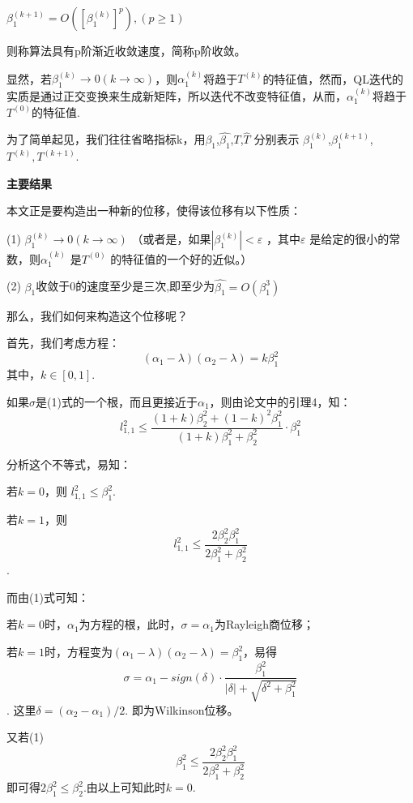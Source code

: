 \documentclass[12pt]{ctexart}
\begin{document}
\begin{center}
$\beta_1^{(k+1)}=O([\beta_1^{(k)}]^{p}),(p\geq1)$
\end{center}
则称算法具有p阶渐近收敛速度，简称p阶收敛。

显然，若$\beta_1^{(k)}\rightarrow0(k\rightarrow\infty)$，则$\alpha_1^{(k)}$将趋于$T^{(k)}$的特征值，然而，QL迭代的实质是通过正交变换来生成新矩阵，所以迭代不改变特征值，从而，$\alpha_1^{(k)}$将趋于$T^{(0)}$的特征值.

为了简单起见，我们往往省略指标k，用$\beta_1$,$\hat{\beta_1}$,$T$,$\hat{T}$
分别表示 $\beta_1^{(k)}$,$\beta_1^{(k+1)}$,$T^{(k)},T^{(k+1)}$.
\begin{center}
\textbf{主要结果}
\end{center}

本文正是要构造出一种新的位移，使得该位移有以下性质：

(1) $\beta_1^{(k)}\rightarrow0(k\rightarrow\infty)$
（或者是，如果$|\beta_1^{(k)}|<\varepsilon$  ，其中$\varepsilon$ 是给定的很小的常数，则$\alpha_1^{(k)}$ 是$T^{(0)}$ 的特征值的一个好的近似。）

(2) $\beta_1$收敛于0的速度至少是三次,即至少为$\hat{\beta_1}=O(\beta_1^3)$

那么，我们如何来构造这个位移呢？

首先，我们考虑方程：
\begin{equation}
(\alpha_1-\lambda)(\alpha_2-\lambda)=k\beta_1^{2}
\end{equation}
其中，$k\in[0,1]$.

如果$\sigma$是(1)式的一个根，而且更接近于$\alpha_1$，则由论文中的引理4，知：
\[
l_{1,1}^2 \leq \frac{(1+k)\beta_2^2 + (1-k)^2\beta_1^2}{(1+k)\beta_1^2
  + \beta_2^2} \cdot \beta_1^2
\]


分析这个不等式，易知：

若$k=0$，则 $l_{1,1}^2\leq\beta_1^2$.

若$k=1$，则\[ l_{1,1}^2\leq\frac{2\beta_2^2\beta_1^2 }{2\beta_1^2
  + \beta_2^2}\].

而由(1)式可知：

若$k=0$时，$\alpha_1$为方程的根，此时，$\sigma=\alpha_1$为Rayleigh商位移；

若$k=1$时，方程变为$(\alpha_1-\lambda)(\alpha_2-\lambda)=\beta_1^{2}$，易得
\[\sigma=\alpha_1-sign(\delta)\cdot\frac{\beta_1^2 }{|\delta|+\sqrt{\delta^2+\beta_1^2}}
\].
这里$\delta=(\alpha_2-\alpha_1)/2$.
即为Wilkinson位移。

又若(1)\[\beta_1^{2}\leq\frac{2\beta_2^2\beta_1^2 }{2\beta_1^2 + \beta_2^2}\] 即可得$2\beta_1^{2}\leq\beta_2^{2}$.由以上可知此时$k=0$.
\end{document}
